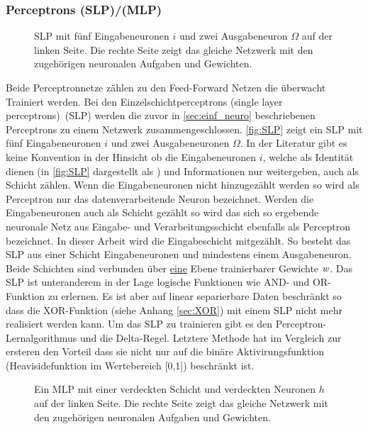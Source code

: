 \subsubsection{Perceptrons (SLP)/(MLP)}
\begin{figure}[!htb]
    \centering
        
    \caption{SLP mit fünf Eingabeneuronen $i$ und zwei Ausgabeneuron $\Omega$ auf der linken Seite. Die rechte Seite zeigt das gleiche Netzwerk mit den zugehörigen neuronalen Aufgaben und Gewichten.}
    \label{fig:SLP}
\end{figure}
Beide Perceptronnetze zählen zu den Feed-Forward Netzen die überwacht Trainiert werden. Bei den Einzelschichtperceptrons (single layer perceptrons)~(SLP) werden die zuvor in \autoref{sec:einf_neuro} beschriebenen Perceptrons zu einem Netzwerk zusammengeschlossen. \autoref{fig:SLP} zeigt ein SLP mit fünf Eingabeneuronen $i$ und zwei Ausgabeneuronen $\Omega$. In der Literatur gibt es keine Konvention in der Hinsicht ob die Eingabeneuronen $i$, welche als Identität dienen (in \autoref{fig:SLP} dargestellt als ) und Informationen nur weitergeben, auch als Schicht zählen. Wenn die Eingabeneuronen nicht hinzugezählt werden so wird als Perceptron nur das datenverarbeitende Neuron  bezeichnet. Werden die Eingabeneuronen auch als Schicht gezählt so wird das sich so ergebende neuronale Netz aus Eingabe- und Verarbeitungsschicht ebenfalls als Perceptron bezeichnet. In dieser Arbeit wird die Eingabeschicht mitgezählt. So besteht das SLP aus einer Schicht Eingabeneuronen und mindestens einem Ausgabeneuron. Beide Schichten sind verbunden über \underline{eine} Ebene trainierbarer Gewichte $\text{\textit{w}}$. Das SLP ist unteranderem in der Lage logische Funktionen wie AND- und OR-Funktion zu erlernen. Es ist aber auf linear separierbare Daten beschränkt so dass die XOR-Funktion (siehe Anhang \ref{sec:XOR}) mit einem SLP nicht mehr realisiert werden kann.
Um das SLP zu trainieren gibt es den Perceptron-Lernalgorithmus und die Delta-Regel. Letztere Methode hat im Vergleich zur ersteren den Vorteil dass sie nicht nur auf die binäre Aktivirungsfunktion (Heavisidefunktion im Wertebereich [0,1]) beschränkt ist.
\\

\begin{figure}[!htb]
    \centering
        
    \caption{Ein MLP mit einer verdeckten Schicht und verdeckten Neuronen $h$ auf der linken Seite. Die rechte Seite zeigt das gleiche Netzwerk mit den zugehörigen neuronalen Aufgaben und Gewichten.}
    \label{fig:MLP}
\end{figure}

